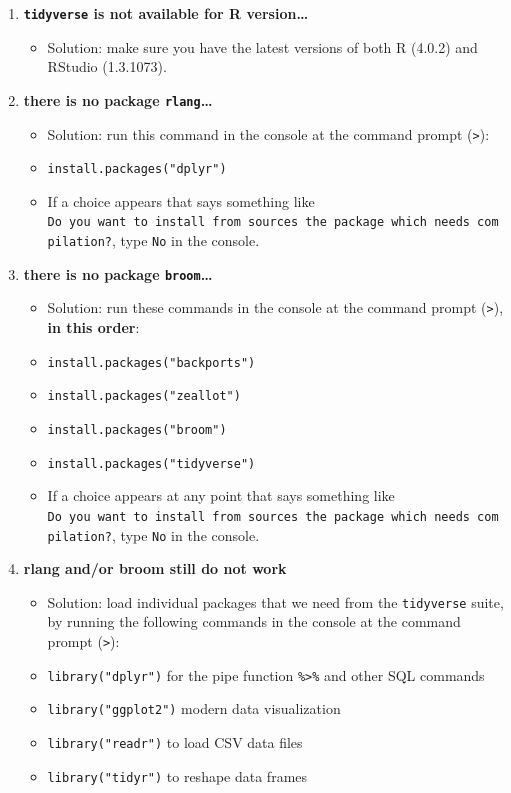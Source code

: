 \documentclass[
]{book}
\providecommand{\tightlist}{%
  \setlength{\itemsep}{0pt}\setlength{\parskip}{0pt}}
\begin{document}
\begin{enumerate}
\def\labelenumi{\arabic{enumi}.}
\tightlist
\item
  \textbf{\texttt{tidyverse} is not available for R version\ldots{}}

  \begin{itemize}
  \tightlist
  \item
    Solution: make sure you have the latest versions of both R (4.0.2) and RStudio (1.3.1073).
  \end{itemize}
\item
  \textbf{there is no package \texttt{rlang}\ldots{}}

  \begin{itemize}
  \tightlist
  \item
    Solution: run this command in the console at the command prompt (\texttt{\textgreater{}}):
  \item
    \texttt{install.packages("dplyr")}
  \item
    If a choice appears that says something like \texttt{Do\ you\ want\ to\ install\ from\ sources\ the\ package\ which\ needs\ compilation?}, type \texttt{No} in the console.
  \end{itemize}
\item
  \textbf{there is no package \texttt{broom}\ldots{}}

  \begin{itemize}
  \tightlist
  \item
    Solution: run these commands in the console at the command prompt (\texttt{\textgreater{}}), \textbf{in this order}:
  \item
    \texttt{install.packages("backports")}
  \item
    \texttt{install.packages("zeallot")}
  \item
    \texttt{install.packages("broom")}
  \item
    \texttt{install.packages("tidyverse")}
  \item
    If a choice appears at any point that says something like \texttt{Do\ you\ want\ to\ install\ from\ sources\ the\ package\ which\ needs\ compilation?}, type \texttt{No} in the console.
  \end{itemize}
\item
  \textbf{rlang and/or broom still do not work}

  \begin{itemize}
  \tightlist
  \item
    Solution: load individual packages that we need from the \texttt{tidyverse} suite, by running the following commands in the console at the command prompt (\texttt{\textgreater{}}):
  \item
    \texttt{library("dplyr")} for the pipe function \texttt{\%\textgreater{}\%} and other SQL commands
  \item
    \texttt{library("ggplot2")} modern data visualization
  \item
    \texttt{library("readr")} to load CSV data files
  \item
    \texttt{library("tidyr")} to reshape data frames
  \end{itemize}
\end{enumerate}
\end{document}
